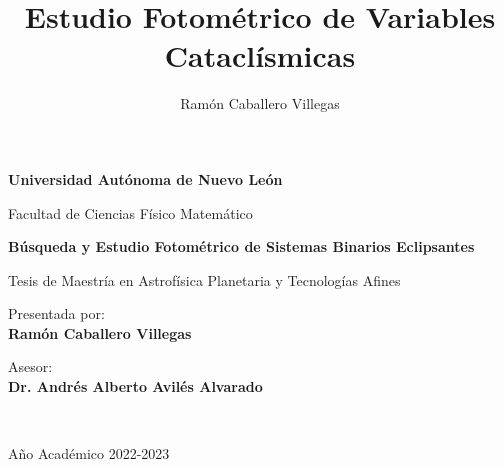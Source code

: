 \documentclass[12pt,a4paper]{report}
\begin{document}
\title{Estudio Fotométrico de Variables Cataclísmicas}
\author{Ramón Caballero Villegas}

\begin{titlepage}
    \begin{center}
        \vspace*{0.2cm}
        {\fontsize{19pt}{20pt}\selectfont \textbf{Universidad Autónoma de Nuevo León}\par}

        \noindent
        \hrulefill
        \vspace{0.8cm}

        \Large
        Facultad de Ciencias Físico Matemático
        \Large

        \vspace{5cm}
        {\fontsize{25pt}{25}\textcolor{MyDarkBlue}{\textbf{Búsqueda y Estudio Fotométrico de Sistemas Binarios Eclipsantes}}}

        \vspace{1cm}
        {\fontsize{16pt}{16pt}Tesis de Maestría en Astrofísica Planetaria y
            Tecnologías Afines}

        \vspace{4.5cm}
        \begin{minipage}[t]{0.34\textwidth}
            \begin{flushleft}
                {\fontsize{16pt}{16pt}Presentada por: \\ \textbf{\textcolor{MyDarkBlue}{Ramón Caballero Villegas}}}
            \end{flushleft}
        \end{minipage}
        \begin{minipage}[t]{0.44\textwidth}
            \begin{flushright} \Large
                Asesor: \\
                \textbf{\textcolor{MyDarkBlue}{Dr. Andrés Alberto Avilés Alvarado}}
            \end{flushright}
        \end{minipage}\\

        \vfill
        \noindent\hrulefill
        \vspace{0.3cm}
        \Large


        Año Académico {\textcolor{MyDarkBlue} {2022-2023}}
    \end{center}
\end{titlepage}
\end{document}
